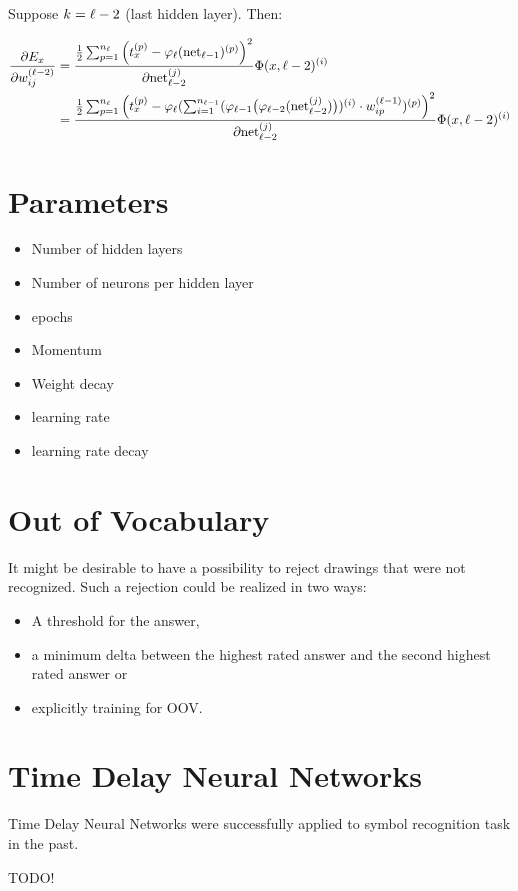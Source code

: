 
Suppose $k = {\ell} - 2$ (last hidden layer). Then:

\begin{align}
    \frac{\partial E_x}{\partial w_{ij}^{({\ell}-2)}} &= \frac{\frac{1}{2} \sum_{p=1}^{n_{\ell}} \left ( t_x^{(p)} -\varphi_{{\ell}}(\mathrm{net}_{{\ell}-1})^{(p)} \right )^2}{\partial \mathrm{net}_{{\ell}-2}^{(j)}} \Phi(x, {\ell}-2)^{(i)}\\
    &= \frac{\frac{1}{2} \sum_{p=1}^{n_{\ell}} \left ( t_x^{(p)} -\varphi_{{\ell}}(\sum_{i=1}^{n_{{\ell}-1}} (
        \varphi_{{\ell}-1} \big (\varphi_{{\ell}-2}(\mathrm{net}_{{\ell}-2}^{(j)}) \big)
    )^{(i)} \cdot w_{ip}^{({\ell}-1)})^{(p)} \right )^2}{\partial \mathrm{net}_{{\ell}-2}^{(j)}} \Phi(x, {\ell}-2)^{(i)}\\
\end{align}

\section{Parameters}
\begin{itemize}
    \item Number of hidden layers
    \item Number of neurons per hidden layer
    \item \Glspl{epoch}
    \item Momentum
    \item Weight decay
    \item \Gls{learning rate}
    \item \Gls{learning rate decay}
\end{itemize}



\section{Out of Vocabulary}
It might be desirable to have a possibility to reject drawings that were not
recognized. Such a rejection could be realized in two ways:

\begin{itemize}
    \item A threshold for the answer,
    \item a minimum delta between the highest rated answer and the second
          highest rated answer or
    \item explicitly training for \gls{OOV}.
\end{itemize}

\section{Time Delay Neural Networks}

Time Delay Neural Networks were successfully applied to symbol recognition task
in the past\cite{Guyon1991,Manke01}.

TODO!